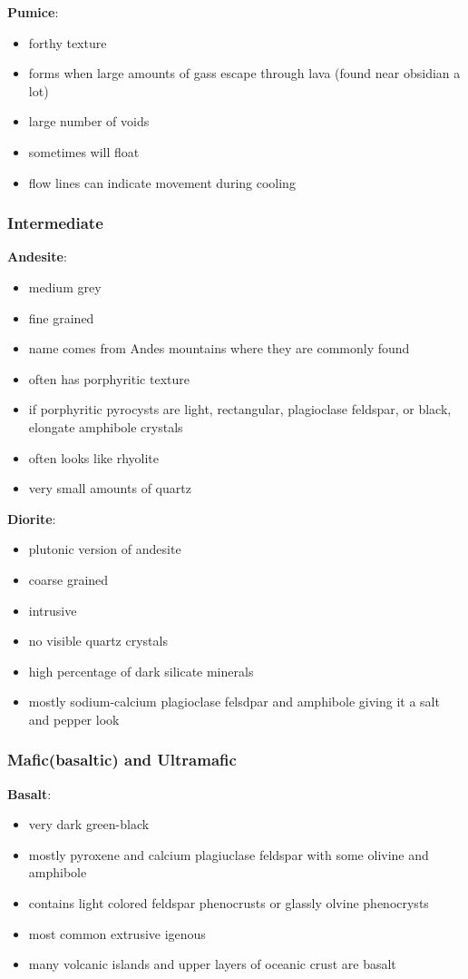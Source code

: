 \documentclass{article}
\begin{document}
\textbf{Pumice}:
\begin{itemize}
    \item forthy texture
    \item forms when large amounts of gass escape through lava (found near obsidian a lot)
    \item large number of voids
    \item sometimes will float
    \item flow lines can indicate movement during cooling
\end{itemize}

\subsubsection{Intermediate} %
\label{subsub:intermediate}
\textbf{Andesite}:
\begin{itemize}
    \item medium grey
    \item fine grained
    \item name comes from Andes mountains where they are commonly found
    \item often has porphyritic texture
    \item if porphyritic pyrocysts are light, rectangular, plagioclase feldspar, or black, elongate amphibole crystals
    \item often looks like rhyolite
    \item very small amounts of quartz
\end{itemize}

\textbf{Diorite}:
\begin{itemize}
    \item plutonic version of andesite
    \item coarse grained
    \item intrusive
    \item no visible quartz crystals
    \item high percentage of dark silicate minerals
    \item mostly sodium-calcium plagioclase felsdpar and amphibole giving it a salt and pepper look
\end{itemize}



\subsubsection{Mafic(basaltic) and Ultramafic} %
\label{subsub:mafic_and_ultramafic}
\textbf{Basalt}:
\begin{itemize}
    \item very dark green-black
    \item mostly pyroxene and calcium plagiuclase feldspar with some olivine and amphibole
    \item contains light colored feldspar phenocrusts or glassly olvine phenocrysts
    \item most common extrusive igenous
    \item many volcanic islands and upper layers of oceanic crust are basalt
\end{itemize}
\end{document}
